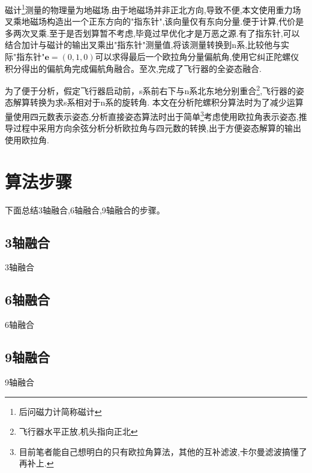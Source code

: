 \documentclass[10pt,a4paper]{article}
\begin{document}
磁计\footnote{后问磁力计简称磁计}测量的物理量为地磁场.由于地磁场并非正北方向,导致不便,本文使用重力场叉乘地磁场构造出一个正东方向的"指东针",该向量仅有东向分量.便于计算,代价是多两次叉乘.至于是否划算暂不考虑,毕竟过早优化才是万恶之源.有了指东针,可以结合加计与磁计的输出叉乘出"指东针"测量值,将该测量转换到n系,比较他与实际"指东针"$\mathbf{e}=(0,1,0)$可以求得最后一个欧拉角分量偏航角,使用它纠正陀螺仪积分得出的偏航角完成偏航角融合。至次,完成了飞行器的全姿态融合.

为了便于分析，假定飞行器启动前，s系前右下与n系北东地分别重合\footnote{飞行器水平正放,机头指向正北},飞行器的姿态解算转换为求s系相对于n系的旋转角. 本文在分析陀螺积分算法时为了减少运算量使用四元数表示姿态,分析直接姿态算法时出于简单\footnote{目前笔者能自己想明白的只有欧拉角算法，其他的互补滤波,卡尔曼滤波搞懂了再补上.}考虑使用欧拉角表示姿态,推导过程中采用方向余弦分析分析欧拉角与四元数的转换,出于方便姿态解算的输出使用欧拉角.




\section{算法步骤}\label{section:最终结论}
下面总结3轴融合,6轴融合,9轴融合的步骤。
\subsection{3轴融合}
3轴融合

\subsection{6轴融合}
6轴融合

\subsection{9轴融合}
9轴融合


\newpage
\renewcommand\refname{参考文献}
\centering %


\end{document}
